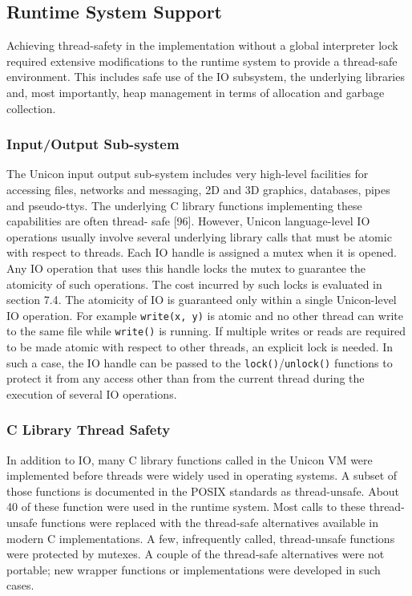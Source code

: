 \subsection{Runtime System Support}
Achieving thread-safety in the implementation without a global interpreter
lock required extensive modifications to the runtime system to provide a
thread-safe environment.  This includes safe use of the IO subsystem,
the underlying libraries and, most importantly, heap management in terms of
allocation and garbage collection.

\subsubsection{Input/Output Sub-system}
The Unicon input output sub-system includes very high-level facilities for
accessing files, networks and messaging, 2D and 3D graphics, databases,
pipes and pseudo-ttys. The underlying C library functions implementing
these capabilities are often thread- safe {\color{red} [96]}. However, Unicon
language-level IO operations usually involve several underlying library
calls that must be atomic with respect to threads. Each IO handle is
assigned a mutex when it is opened.  Any IO operation that uses this handle
locks the mutex to guarantee the atomicity of such operations. The cost
incurred by such locks is evaluated in {\color{red} section 7.4}.  The
atomicity of IO is guaranteed only within a single Unicon-level IO
operation. For example \texttt{write(x, y)} is atomic and no other thread
can write to the same file while \texttt{write()} is running.  If multiple
writes or reads are required to be made atomic with respect to other
threads, an explicit lock is needed. In such a case, the IO handle can be
passed to the \texttt{lock()}/\texttt{unlock()} functions to protect it
from any access other than from the current thread during the execution of
several IO operations.

\subsubsection{C Library Thread Safety}
In addition to IO, many C library functions called in the Unicon VM were
implemented before threads were widely used in operating systems. A subset
of those functions is documented in the POSIX standards as
thread-unsafe. About 40 of these function were used in the runtime system.
Most calls to these thread-unsafe functions were replaced with the
thread-safe alternatives available in modern C implementations. A few,
infrequently called, thread-unsafe functions were protected by mutexes. A
couple of the thread-safe alternatives were not portable; new wrapper
functions or implementations were developed in such cases.

